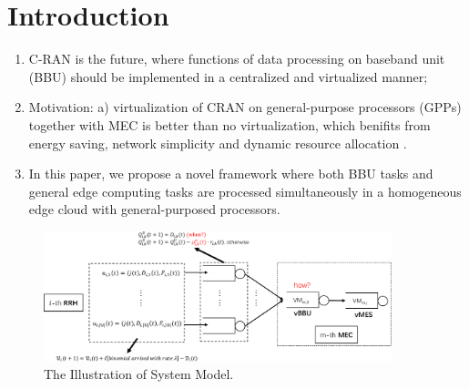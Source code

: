 \section{Introduction}
\label{sec:intro}

\begin{enumerate}
	\item C-RAN is the future, where functions of data processing on baseband unit (BBU) should be implemented in a centralized and virtualized manner;
	\item Motivation: a) virtualization of CRAN on general-purpose processors (GPPs) together with MEC is better than no virtualization, which benifits from energy saving, network simplicity and dynamic resource allocation \cite{cran-survey}.
	\item In this paper, we propose a novel framework where both BBU tasks and general edge computing tasks are processed simultaneously in a homogeneous edge cloud with general-purposed processors.
\end{enumerate}

\begin{figure}[htb!]
	\centering
	\includegraphics[width=0.9\textwidth]{images/cran-system-model.pdf}
	\caption{The Illustration of System Model.}
	\label{fig:scenario}
\end{figure}
